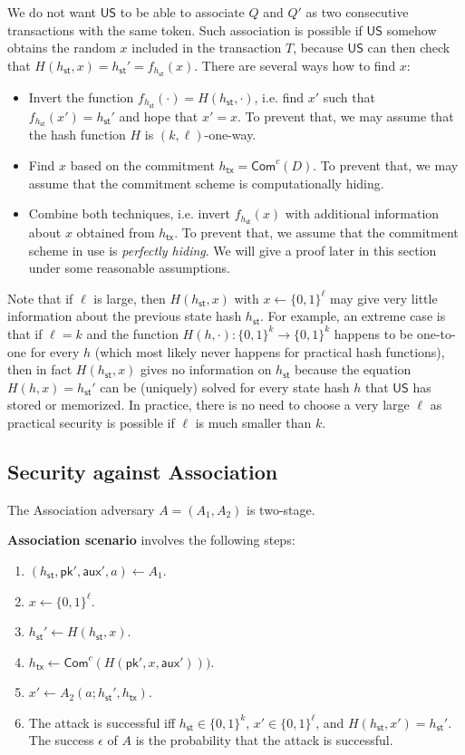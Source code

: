 \documentclass{article}
\newcommand{\pubkey}[0]{\mathsf{pk}}
\newcommand{\commitc}[0]{\mathsf{Com}^{c}}
\newcommand{\unisrv}[0]{\mathsf{US}}
\newcommand{\sthash}[0]{h_\mathsf{st}}
\newcommand{\txhash}[0]{h_\mathsf{tx}}
\newcommand{\auxd}[0]{\mathsf{aux}}
\begin{document}
We do not want $\unisrv$ to be able to associate $Q$ and $Q'$ as two consecutive transactions with the same token. Such association is possible if $\unisrv$ somehow obtains the random $x$ included in the transaction $T$, because $\unisrv$ can then check that $H(\sthash,x)=\sthash'=f_{\sthash}(x)$. There are several ways how to find $x$:
\begin{itemize}
\item Invert the function $f_{\sthash}(\cdot)=H(\sthash,\cdot)$, i.e. find $x'$ such that $f_{\sthash}(x')=\sthash'$ and hope that $x'=x$. To prevent that, we may assume that the hash function $H$ is $(k,\ell)$-one-way.
\item Find $x$ based on the commitment $\txhash=\commitc(D)$. To prevent that, we may assume that the commitment scheme is computationally hiding.
\item Combine both techniques, i.e. invert $f_{\sthash}(x)$ with additional information about $x$ obtained from $\txhash$. To prevent that, we assume that the commitment scheme in use is \emph{perfectly hiding}. We will give a proof later in this section under some reasonable assumptions.
\end{itemize}

\noindent Note that if $\ell$ is large, then $H(\sthash,x)$ with $x\gets \{0,1\}^\ell$ may give very little information about the previous state hash $\sthash$.
For example, an extreme case is that if $\ell=k$ and the function $H(h,\cdot)\colon \{0,1\}^k\rightarrow \{0,1\}^k$ happens to be one-to-one for every $h$ (which most likely never happens for practical hash functions), then in fact $H(\sthash,x)$ gives no information on $\sthash$  because the equation $H(h,x)=\sthash'$ can be (uniquely) solved for every state hash $h$ that $\unisrv$ has stored or memorized. In practice, there is no need to choose a very large $\ell$ as practical security is possible if $\ell$ is much smaller than $k$.

\subsection{Security against Association}

The Association adversary $A=(A_1,A_2)$ is two-stage. \medskip

\noindent\textbf{Association scenario} involves the following steps:
\begin{enumerate}
\item $(\sthash, \pubkey', \auxd', a)\gets A_1$.
\item $x\gets \{0,1\}^\ell$.
\item $\sthash'\gets H(\sthash,x)$.
\item $\txhash\gets\commitc(H(\pubkey',x,\auxd')))$.
\item $x'\gets A_2(a; \sthash',\txhash)$.
\item The attack is successful iff $\sthash\in\{0,1\}^k$, $x'\in\{0,1\}^\ell$, and $H(\sthash,x')=\sthash'$. The success $\epsilon$ of $A$ is the probability that the attack is successful.
\end{enumerate}
\end{document}
